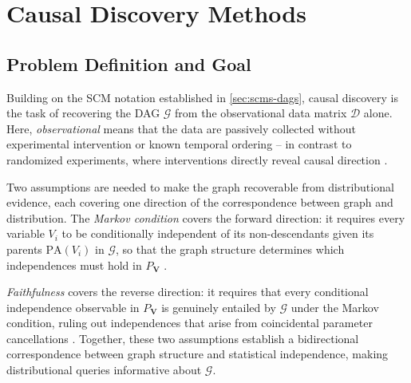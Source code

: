 \section{Causal Discovery Methods}\label{causal-discovery-methods}

\subsection*{Problem Definition and Goal}\label{sec:causal-discovery-background}
Building on the SCM notation established in \ref{sec:scms-dags}, causal discovery is the task of recovering the DAG $\mathcal{G}$ from the observational data matrix $\mathcal{D}$ alone. Here, \emph{observational} means that the data are passively collected without experimental intervention or known temporal ordering -- in contrast to randomized experiments, where interventions directly reveal causal direction \cite{Spirtes2001CausationPA, Peters2017ElementsOC}.

Two assumptions are needed to make the graph recoverable from distributional evidence, each covering one direction of the correspondence between graph and distribution. The \emph{Markov condition} covers the forward direction: it requires every variable $V_i$ to be conditionally independent of its non-descendants given its parents $\mathrm{PA}(V_i)$ in $\mathcal{G}$, so that the graph structure determines which independences must hold in $P_{\mathbf{V}}$ \cite{Pearl_2009, Spirtes2001CausationPA}.

\emph{Faithfulness} covers the reverse direction: it requires that every conditional independence observable in $P_{\mathbf{V}}$ is genuinely entailed by $\mathcal{G}$ under the Markov condition, ruling out independences that arise from coincidental parameter cancellations \cite{Spirtes2001CausationPA}. Together, these two assumptions establish a bidirectional correspondence between graph structure and statistical independence, making distributional queries informative about $\mathcal{G}$.

